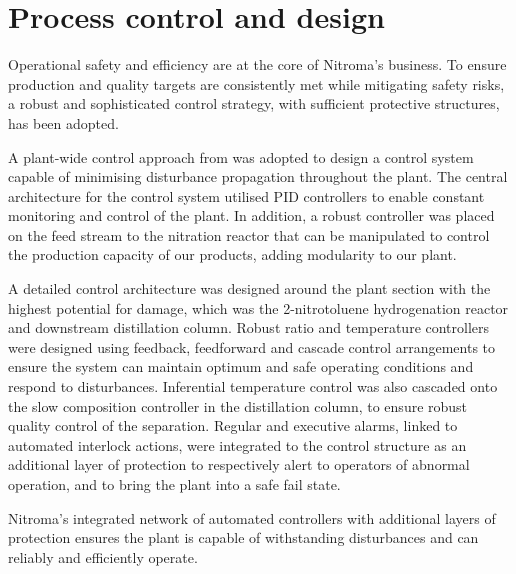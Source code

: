 \section*{Process control and design}

Operational safety and efficiency are at the core of Nitroma's business. To ensure production and quality targets are consistently met while mitigating safety risks, a robust and sophisticated control strategy, with sufficient protective structures, has been adopted.

A plant-wide control approach from \textcite{luyben_plantwide_1997} was adopted to design a control system capable of minimising disturbance propagation throughout the plant. The central architecture for the control system utilised PID controllers to enable constant monitoring and control of the plant. In addition, a robust controller was placed on the feed stream to the nitration reactor that can be manipulated to control the production capacity of our products, adding modularity to our plant.      


A detailed control architecture was designed around the plant section with the highest potential for damage, which was the 2-nitrotoluene hydrogenation reactor and downstream distillation column. Robust ratio and temperature controllers were designed using feedback, feedforward and cascade control arrangements to ensure the system can maintain optimum and safe operating conditions and respond to disturbances. Inferential temperature control was also cascaded onto the slow composition controller in the distillation column, to ensure robust quality control of the separation. Regular and executive alarms, linked to automated interlock actions, were integrated to the control structure as an additional layer of protection to respectively alert to operators of abnormal operation, and to bring the plant into a safe fail state. 

Nitroma's integrated network of automated controllers with additional layers of protection ensures the plant is capable of withstanding disturbances and can reliably and efficiently operate. 



